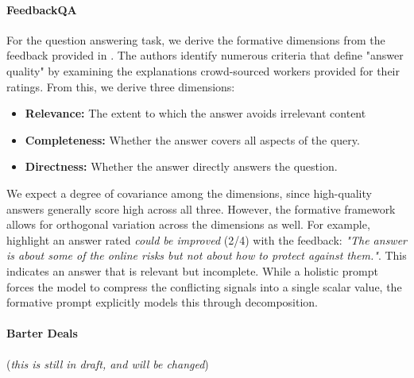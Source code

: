 

\paragraph{FeedbackQA}

For the question answering task, we derive the formative dimensions from the feedback provided in \citet{li_using_2022}. The authors identify numerous criteria that define "answer quality" by examining the explanations crowd-sourced workers provided for their ratings. From this, we derive three dimensions:

\begin{itemize}
    \item \textbf{Relevance:} The extent to which the answer avoids irrelevant content
    \item \textbf{Completeness:} Whether the answer covers all aspects of the query.
    \item \textbf{Directness:} Whether the answer directly answers the question.
\end{itemize}

We expect a degree of covariance among the dimensions, since high-quality answers generally score high across all three. However, the formative framework allows for orthogonal variation across the dimensions as well. For example, \citet{li_using_2022} highlight an answer rated \textit{could be improved} (2/4) with the feedback: \textit{"The answer is about some of the online risks but not about how to protect against them."}. This indicates an answer that is relevant but incomplete. While a holistic prompt forces the model to compress the conflicting signals into a single scalar value, the formative prompt explicitly models this through decomposition.

\paragraph{Barter Deals}

(\textit{this is still in draft, and will be changed})


